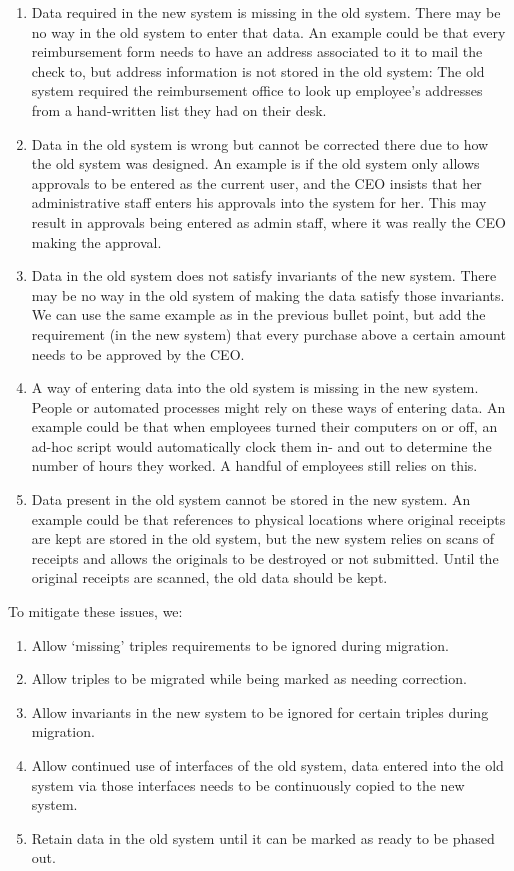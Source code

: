 \documentclass{elsarticle}
\begin{document}
	\begin{enumerate}
	\item Data required in the new system is missing in the old system.
	There may be no way in the old system to enter that data.
	An example could be that every reimbursement form needs to have an address associated to it to mail the check to, but address information is not stored in the old system:
	The old system required the reimbursement office to look up employee's addresses from a hand-written list they had on their desk.
	\item Data in the old system is wrong but cannot be corrected there due to how the old system was designed.
	An example is if the old system only allows approvals to be entered as the current user, and the CEO insists that her administrative staff enters his approvals into the system for her.
	This may result in approvals being entered as admin staff, where it was really the CEO making the approval.
	\item Data in the old system does not satisfy invariants of the new system.
	There may be no way in the old system of making the data satisfy those invariants. We can use the same example as in the previous bullet point, but add the requirement (in the new system) that every purchase above a certain amount needs to be approved by the CEO.
	\item A way of entering data into the old system is missing in the new system.
	People or automated processes might rely on these ways of entering data.
	An example could be that when employees turned their computers on or off, an ad-hoc script would automatically clock them in- and out to determine the number of hours they worked.
	A handful of employees still relies on this.
	\item Data present in the old system cannot be stored in the new system.
	An example could be that references to physical locations where original receipts are kept are stored in the old system, but the new system relies on scans of receipts and allows the originals to be destroyed or not submitted.
	Until the original receipts are scanned, the old data should be kept.
	\end{enumerate}
	
	To mitigate these issues, we:
	
	\begin{enumerate}
	\item Allow `missing' triples requirements to be ignored during migration.
	\item Allow triples to be migrated while being marked as needing correction.
	\item Allow invariants in the new system to be ignored for certain triples during migration.
	\item Allow continued use of interfaces of the old system, data entered into the old system via those interfaces needs to be continuously copied to the new system.
	\item Retain data in the old system until it can be marked as ready to be phased out.
	\end{enumerate}	
\end{document}
